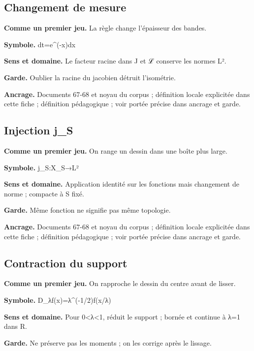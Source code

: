 \documentclass[
  9pt,
  a4paper,
]{article}
\begin{document}
\hypertarget{changement-de-mesure}{%
\subsection{Changement de mesure}\label{changement-de-mesure}}

\textbf{Comme un premier jeu.} La règle change l'épaisseur des bandes.

\textbf{Symbole.} dt=e\^{}(-x)dx

\textbf{Sens et domaine.} Le facteur racine dans J et ℒ conserve les
normes L².

\textbf{Garde.} Oublier la racine du jacobien détruit l'isométrie.

\textbf{Ancrage.} Documents 67-68 et noyau du corpus ; définition locale
explicitée dans cette fiche ; définition pédagogique ; voir portée
précise dans ancrage et garde.

\hypertarget{injection-j_s}{%
\subsection{Injection j\_S}\label{injection-j_s}}

\textbf{Comme un premier jeu.} On range un dessin dans une boîte plus
large.

\textbf{Symbole.} j\_S:X\_S→L²

\textbf{Sens et domaine.} Application identité sur les fonctions mais
changement de norme ; compacte à S fixé.

\textbf{Garde.} Même fonction ne signifie pas même topologie.

\textbf{Ancrage.} Documents 67-68 et noyau du corpus ; définition locale
explicitée dans cette fiche ; définition pédagogique ; voir portée
précise dans ancrage et garde.

\hypertarget{contraction-du-support}{%
\subsection{Contraction du support}\label{contraction-du-support}}

\textbf{Comme un premier jeu.} On rapproche le dessin du centre avant de
lisser.

\textbf{Symbole.} D\_λf(x)=λ\^{}(-1/2)f(x/λ)

\textbf{Sens et domaine.} Pour 0\textless λ\textless1, réduit le support
; bornée et continue à λ=1 dans R.

\textbf{Garde.} Ne préserve pas les moments ; on les corrige après le
lissage.
\end{document}
